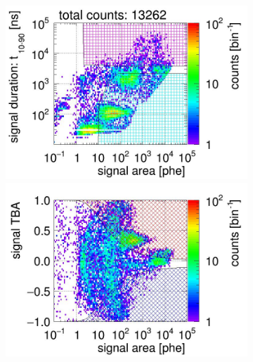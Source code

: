 \begin{landscape}%
	\begin{figure}[!p]
		\centering
		\begin{subfigure}[t]{0.33\textwidth} %
			\centering
			\includegraphics[width=\figurewidth,clip,trim={0 98 0 0}]{Figures/GasTest/CutsValid/res64765/pdpa22Vecfig64765.jpg}
			\includegraphics[width=\figurewidth,clip,trim={0 0 0 40}]{Figures/GasTest/CutsValid/res64765/tbapa22Vecfig64765.jpg}
			\caption{}
			\label{fig:signal selection dv 08 01}
		\end{subfigure}
		\begin{subfigure}[t]{0.33\textwidth}
			\centering

\end{subfigure}
\end{figure}
\end{landscape}
